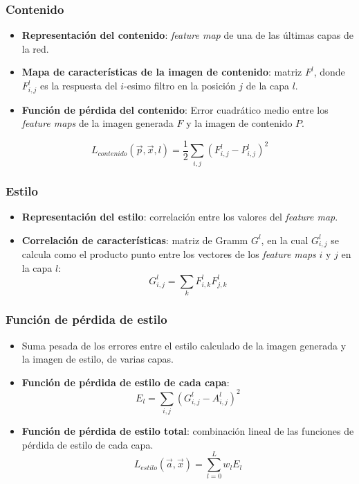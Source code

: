 \documentclass[10pt,center]{beamer}
\begin{document}
\begin{frame}
 \frametitle{Contenido}
  \begin{itemize}
   \item \textbf{Representación del contenido}: \textit{feature map} de una de las últimas capas de la red.
   \item \textbf{Mapa de características de la imagen de contenido}: matriz $F^l$, donde $F_{i,j}^l$ es la respuesta del $i$-esimo filtro en la posición $j$ de la capa $l$.
   \item \textbf{Función de pérdida del contenido}: Error cuadrático medio entre los \textit{feature maps} de la imagen generada $F$ y la imagen de contenido $P$.
  \end{itemize}
  \begin{equation*}
    L_{contenido}(\overrightarrow{p},\overrightarrow{x}, l) = \frac{1}{2} \sum_{i,j} (F_{i,j}^l - P_{i,j}^l)^2
  \end{equation*}
\end{frame}

\begin{frame}
 \frametitle{Estilo}
  \begin{itemize}
    \item \textbf{Representación del estilo}: correlación entre los valores del \textit{feature map}.
    \item \textbf{Correlación de características}: matriz de Gramm $G^l$, en la cual $G_{i,j}^l$ se calcula como el producto punto entre los vectores
      de los \textit{feature maps} $i$ y $j$ en la capa $l$:
	\begin{equation*}
	  G_{i,j}^l = \sum_{k} F_{i,k}^l F_{j,k}^l
	\end{equation*}
  \end{itemize}

\end{frame}

\begin{frame}
  \frametitle{Función de pérdida de estilo}
  \begin{itemize}
   \item Suma pesada de los errores entre el estilo calculado de la imagen generada y la imagen de estilo, de varias capas.
   \item \textbf{Función de pérdida de estilo de cada capa}:
      \begin{equation*}
	E_l = \sum_{i,j} (G_{i,j}^l - A_{i,j}^l)^2
      \end{equation*}
   \item \textbf{Función de pérdida de estilo total}: combinación lineal de las funciones de pérdida de estilo de cada capa.
      \begin{equation*}
	L_{estilo}(\overrightarrow{a},\overrightarrow{x}) = \sum_{l=0}^{L} w_l E_l
      \end{equation*}
  \end{itemize}
\end{frame}
\end{document}
